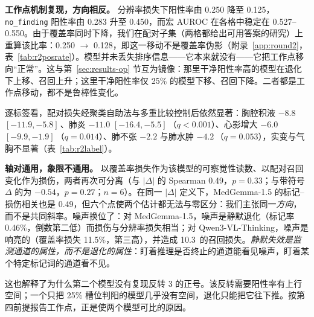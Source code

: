 \textbf{工作点机制复现，方向相反。} 分辨率损失下阳性率由 0.250 降至 0.125，\texttt{no\_finding} 阳性率由 0.283 升至 0.450，而宏 AUROC 在各格中稳定在 0.527--0.550。由于覆盖率同时下降，我们在配对子集（两格都给出可用答案的研究）上重算该比率：0.250 $\rightarrow$ 0.128，即这一移动不是覆盖率伪影（附录~\ref{app:round2}，表~\ref{tab:r2posrate}）。模型并未丢失排序信息——它本来就没有——它把工作点移向``正常''。这与第~\ref{sec:results-op} 节互为镜像：那里干净阳性率高的模型在退化下上移、召回上升；这里干净阳性率仅 25\% 的模型下移、召回下降。二者都是工作点移动，都不是鲁棒性变化。

逐标签看，配对损失经聚类自助法与多重比较控制后依然显著：胸腔积液 $-8.8$ $[-11.9,-5.8]$\,\pp{}、肺炎 $-11.0$ $[-16.4,-5.5]$\,\pp{}（$q<0.001$）、心影增大 $-6.0$ $[-9.9,-1.9]$\,\pp{}（$q=0.014$）、肺不张 $-2.2$ 与肺水肿 $-4.2$\,\pp{}（$q=0.053$），实变与气胸不显著（表~\ref{tab:r2label}）。

\textbf{轴对通用，象限不通用。} 以覆盖率损失作为该模型的可察觉性读数、以配对召回变化作为损伤，两者再次可分离（与 $|\Delta|$ 的 Spearman 0.49，$p=0.33$；与带符号 $\Delta$ 的为 $-0.54$，$p=0.27$；$n=6$）。在同一 $|\Delta|$ 定义下，MedGemma-1.5 的标记--损伤相关也是 0.49，但六个点使两个估计都无法与零区分：我们主张同一\emph{方向}，而不是共同斜率。噪声换位了：对 MedGemma-1.5，噪声是静默退化（标记率 0.46\%，倒数第二低）而损伤与分辨率损失相当；对 Qwen3-VL-Thinking，噪声是响亮的（覆盖率损失 11.5\%，第三高），并造成 10.3\,\pp{} 的召回损失。\emph{静默失效是监测通道的属性，而不是退化的属性}：盯着推理是否终止的通道能看见噪声，盯着某个特定标记词的通道看不见。

这也解释了为什么第二个模型没有复现反转 3 的正号。该反转需要阳性率有上行空间；一个只把 25\% 槽位判阳的模型几乎没有空间，退化只能把它往下推。按第四前提报告工作点，正是使两个模型可比的原因。
